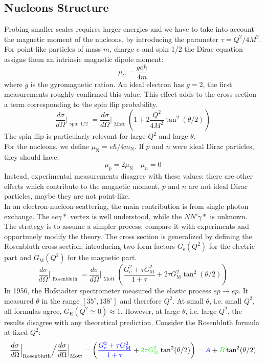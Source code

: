 \documentclass[10.75pt,a4paper,openright,bottom=2cm]{article}
\begin{document}
\subsection{Nucleons Structure}
Probing smaller scales requires larger energies and we have to take into account the magnetic moment of the nucleons, by introducing the parameter $\tau=Q^2/4M^2$. For point-like particles of mass $m$, charge $e$ and spin 1/2 the Dirac equation assigns them an intrinsic magnetic dipole moment:
\[
\mu_C=\frac{ge\hbar}{4m}
\]
where $g$ is the gyromagnetic ration. An ideal electron has $g=2$, the first measurements roughly confirmed this value. This effect adds to the cross section a term corresponding to the spin flip probability.
\[
\frac{d\sigma}{d\Omega}\Bigr|_{\substack{\text{spin 1/2}}}=\frac{d\sigma}{d\Omega}\Bigr|_{\substack{\text{Mott}}}\left(1+2\frac{Q^2}{4M^2}\tan^2(\theta/2)\right)
\]
The spin flip is particularly relevant for large $Q^2$ and large $\theta$.\\
For the nucleons, we define $\mu_{\text{N}}=e\hbar/4m_{\text{N}}$. If $p$ and $n$ were ideal Dirac particles, they should have:
\[
\mu_p=2\mu_{\text{N}} \quad \mu_n=0
\]
Instead, experimental measurements disagree with these values: there are other effects which contribute to the magnetic moment, $p$ and $n$ are not ideal Dirac particles, maybe they are not point-like.\\
In an electron-nucleon scattering, the main contribution is from single photon exchange. The $ee\gamma*$ vertex is well understood, while the $NN'\gamma*$ is unknown. The strategy is to assume a simpler process, compare it with experiments and opportunely modify the theory. The cross section is generalized by defining the Rosenbluth cross section, introducing two form factors $G_{\text{e}}(Q^2)$ for the electric part and $G_{\text{M}}(Q^2)$ for the magnetic part.
\[
\frac{d\sigma}{d\Omega}\Bigr|_{\substack{\text{Rosenbluth}}}=\frac{d\sigma}{d\Omega}\Bigr|_{\substack{\text{Mott}}}\left(\frac{G_{\text{e}}^2+\tau G_{\text{M}}^2}{1+\tau}+2\tau G_{\text{M}}^2\tan^2(\theta/2)\right)
\]
In 1956, the Hofstadter spectrometer measured the elastic process $ep\to ep$. It measured $\theta$ in the range $[35^\circ,138^\circ]$ and therefore $Q^2$. At small $\theta$, i.e. small $Q^2$, all formulas agree, $G_{\text{E}}(Q^2\simeq0)\approx1$. However, at large $\theta$, i.e. large $Q^2$, the results disagree with any theoretical prediction. Consider the Rosenbluth formula at fixed $Q^2$:
\[
\frac{d\sigma}{d\Omega}\Bigr|_{\substack{\text{Rosenbluth}}}\Bigr/\frac{d\sigma}{d\Omega}\Bigr|_{\substack{\text{Mott}}}=\left({\color{blue}\frac{G_{\text{e}}^2+\tau G_{\text{M}}^2}{1+\tau}}+{\color{green}2\tau G_{\text{M}}^2}\tan^2(\theta/2)\right)={\color{blue}A}+{\color{green}B}\tan^2(\theta/2)
\]
\end{document}
